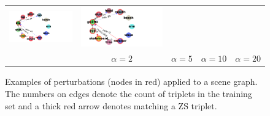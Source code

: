 \begin{figure}[t]
\begin{tabular}{p{0.25cm}c|c|c|c}
		\includegraphics[align=c,width=\width,trim={2cm 0.1cm 7cm 0.1cm},clip]{2350517_structn_L0_5_topk5_a10_graph_7.png} & \includegraphics[align=c,width=\width,trim={1.5cm 0.1cm 7cm 0.1cm},clip]{2350517_structn_L0_5_topk5_a20_graph_2.png}\Tstrut\\
		& $\alpha=2$ & $\alpha=5$ & $\alpha=10$ & $\alpha=20$ \\
	\end{tabular}
	\vspace{-5pt}
	\caption{\small Examples of perturbations (nodes in red) applied to a scene graph. The numbers on edges denote the count of triplets in the training set and a thick red arrow denotes matching a ZS triplet.}
	\label{fig:examples}
\end{figure}


